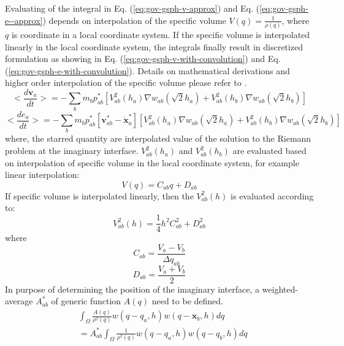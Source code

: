 Evaluating of the integral in Eq. (\ref{eq:gov-gsph-v-approx}) and Eq. (\ref{eq:gov-gsph-e--approx}) depends on interpolation of the specific volume $V(q) = \frac{1}{\rho(q)}$, where $q$ is coordinate in a local coordinate system. If the specific volume is interpolated linearly in the local coordinate system, the integrals finally result in discretized formulation as showing in Eq. (\ref{eq:gov-gsph-v-with-convolution}) and Eq. (\ref{eq:gov-gsph-e-with-convolution}).
Details on mathematical derivations and higher order interpolation of the specific volume please refer to \citep{inutsuka2002reformulation}.
\begin{equation}
<\dfrac{d \textbf{v}_{a}}{dt}>= -\sum_{b} m_{b} p_{a b}^{\ast} \left[ V_{ab}^2(h_a) \nabla w_{a b}(\sqrt{2} h_{a}) + V_{ab}^2(h_b) \nabla w_{a b}(\sqrt{2} h_{b}) \right]
\label{eq:gov-gsph-v-with-convolution}
\end{equation}
\begin{equation}
<\dfrac{d e_{a}}{dt}>= - \sum_{b} m_{b} p_{a b}^{\ast} [\textbf{v}_{a b}^{\ast} - \dot{\textbf{x}}_{a}^{\ast}] \left[V_{ab}^2(h_a) \nabla w_{a b}(\sqrt{2} h_{a}) + V_{ab}^2(h_b) \nabla w_{a b}(\sqrt{2} h_{b}) \right]
\label{eq:gov-gsph-e-with-convolution}
\end{equation}
where, the starred quantity are interpolated value of the solution to the Riemann problem at the imaginary interface.
$V_{ab}^2(h_a)$ and $V_{ab}^2(h_b)$ are evaluated based on interpolation of specific volume in the local coordinate system, for example linear interpolation: 
\begin{equation}
V(q) = C_{ab}q+D_{ab}
\label{eq:gsph-V-linear-interplation}
\end{equation}
If specific volume is interpolated linearly, then the $V^2_{ab}(h)$ is evaluated according to:
\begin{equation}
V^2_{ab}(h) = \frac{1}{4}h^2C_{ab}^2+D_{ab}^2
\label{eq:gsph-V-linear-interplation-sq}
\end{equation}
where
\begin{equation}
C_{ab} = \frac{V_a-V_b}{\Delta q_{ab}}
\label{eq:gsph-V-linear-interplation-C}
\end{equation}
\begin{equation}
D_{ab} = \frac{V_a+V_b}{2}
\label{eq:gsph-V-linear-interplation-D}
\end{equation}
In purpose of determining the position of the imaginary interface, a weighted-average $A_{ab}^{\ast}$ of generic function $A(q)$ need to be defined.
\begin{equation}
\begin{split}
& \int_{\Omega} \frac{A\left(q \right)}{\rho^2(q)} w\left(q -q_a, h\right) w(q - \textbf{x}_{b}, h) dq \\
& =A_{ab}^{\ast} \int_{\Omega} \frac{1}{\rho^2(q)} w\left(q -q_a, h\right) w(q - q_{b}, h) dq
\end{split}
\label{eq:GSPH-f-interpolation-def}
\end{equation}
